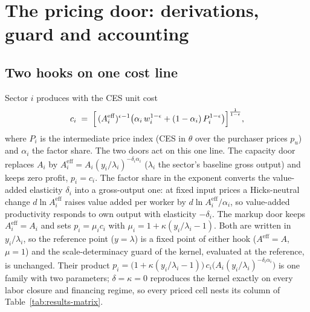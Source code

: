 \section{The pricing door: derivations, guard and accounting}\label{app:pricing-door}

\subsection{Two hooks on one cost line}\label{app:pricing-hooks}
Sector $i$ produces with the CES unit cost
\begin{equation}\label{eq:app-unit-cost}
  c_i \;=\; \Bigl[\,(A^{\mathrm{eff}}_i)^{\epsilon-1}\bigl(\alpha_i\,w_i^{1-\epsilon}
     + (1-\alpha_i)\,P_i^{1-\epsilon}\bigr)\Bigr]^{\frac{1}{1-\epsilon}},
\end{equation}
where $P_i$ is the intermediate price index (CES in $\theta$ over the
purchaser prices $p_u$) and $\alpha_i$ the factor share. The two doors act on
this one line. The capacity door replaces $A_i$ by
$A^{\mathrm{eff}}_i = A_i (y_i/\lambda_i)^{-\delta_i \alpha_i}$ ($\lambda_i$ the sector's baseline gross output) and keeps zero profit,
$p_i = c_i$. The factor share in the exponent converts the value-added
elasticity $\delta_i$ into a gross-output one: at fixed input prices a
Hicks-neutral change $d\ln A^{\mathrm{eff}}_i$ raises value added per worker by
$d\ln A^{\mathrm{eff}}_i/\alpha_i$, so value-added productivity responds to own
output with elasticity $-\delta_i$. The markup door keeps $A^{\mathrm{eff}}_i = A_i$ and sets
$p_i = \mu_i c_i$ with $\mu_i = 1 + \kappa(y_i/\lambda_i - 1)$. Both are
written in $y_i/\lambda_i$, so the reference point ($y = \lambda$) is a
fixed point of either hook ($A^{\mathrm{eff}} = A$, $\mu = 1$) and the
scale-determinacy guard of the kernel, evaluated at the reference, is
unchanged. Their product
$p_i = \bigl(1 + \kappa(y_i/\lambda_i - 1)\bigr)\,c_i\bigl(A_i (y_i/\lambda_i)^{-\delta_i\alpha_i}\bigr)$
is one family with two parameters; $\delta = \kappa = 0$ reproduces the
kernel exactly on every labor closure and financing regime, so every priced
cell nests its column of Table~\ref{tab:results-matrix}.

